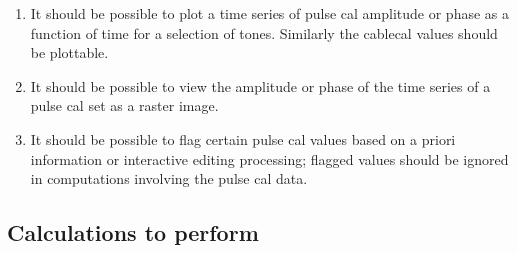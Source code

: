 \documentclass[11pt,a4paper]{article}
\begin{document}
\begin{enumerate}[subseclist]

\item It should be possible to plot a time series of pulse cal
  amplitude or phase as a function of time for a selection of
  tones. Similarly the cablecal values should be plottable.

\item It should be possible to view the amplitude or phase of the time
  series of a pulse cal set as a raster image.

\item It should be possible to flag certain pulse cal values based on
  a priori information or interactive editing processing; flagged
  values should be ignored in computations involving the pulse cal
  data.

\end{enumerate}

\subsection{Calculations to perform}
\end{document}
